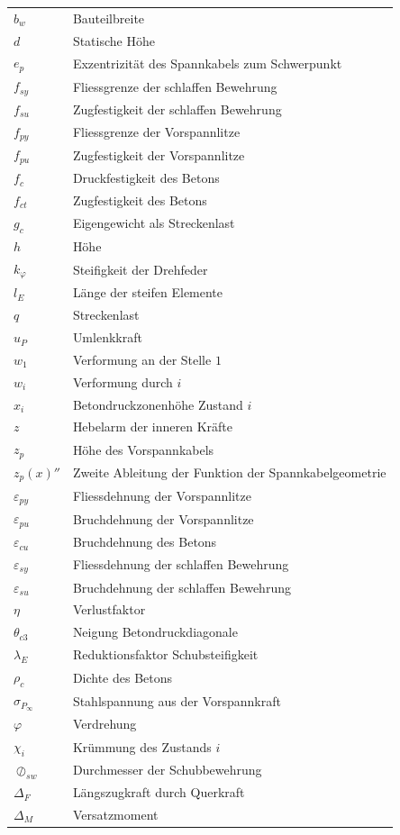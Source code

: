\documentclass[
  11pt,
  letterpaper,
]{scrreprt}
\begin{document}
\begin{longtable}[]{@{}
  >{\raggedright\arraybackslash}p{}
  >{\raggedright\arraybackslash}p{}@{}}
\(b_w\) & Bauteilbreite \\
\(d\) & Statische Höhe \\
\(e_{p}\) & Exzentrizität des Spannkabels zum Schwerpunkt \\
\(f_{sy}\) & Fliessgrenze der schlaffen Bewehrung \\
\(f_{su}\) & Zugfestigkeit der schlaffen Bewehrung \\
\(f_{py}\) & Fliessgrenze der Vorspannlitze \\
\(f_{pu}\) & Zugfestigkeit der Vorspannlitze \\
\(f_{c}\) & Druckfestigkeit des Betons \\
\(f_{ct}\) & Zugfestigkeit des Betons \\
\(g_c\) & Eigengewicht als Streckenlast \\
\(h\) & Höhe \\
\(k_{\varphi}\) & Steifigkeit der Drehfeder \\
\(l_E\) & Länge der steifen Elemente \\
\(q\) & Streckenlast \\
\(u_P\) & Umlenkkraft \\
\(w_1\) & Verformung an der Stelle \(1\) \\
\(w_i\) & Verformung durch \(i\) \\
\(x_i\) & Betondruckzonenhöhe Zustand \(i\) \\
\(z\) & Hebelarm der inneren Kräfte \\
\(z_p\) & Höhe des Vorspannkabels \\
\(z_p(x)''\) & Zweite Ableitung der Funktion der Spannkabelgeometrie \\
\(\varepsilon_{py}\) & Fliessdehnung der Vorspannlitze \\
\(\varepsilon_{pu}\) & Bruchdehnung der Vorspannlitze \\
\(\varepsilon_{cu}\) & Bruchdehnung des Betons \\
\(\varepsilon_{sy}\) & Fliessdehnung der schlaffen Bewehrung \\
\(\varepsilon_{su}\) & Bruchdehnung der schlaffen Bewehrung \\
\(\eta\) & Verlustfaktor \\
\(\theta_{c3}\) & Neigung Betondruckdiagonale \\
\(\lambda_E\) & Reduktionsfaktor Schubsteifigkeit \\
\(\rho_c\) & Dichte des Betons \\
\(\sigma_{P_\infty}\) & Stahlspannung aus der Vorspannkraft \\
\(\varphi\) & Verdrehung \\
\(\chi_i\) & Krümmung des Zustands \(i\) \\
\(\oslash_{sw}\) & Durchmesser der Schubbewehrung \\
\(\Delta_F\) & Längszugkraft durch Querkraft \\
\(\Delta_M\) & Versatzmoment \\
\end{longtable}
\end{document}
